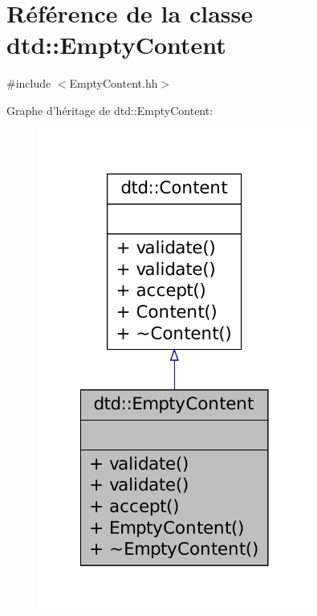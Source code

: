 \hypertarget{classdtd_1_1_empty_content}{
\section{Référence de la classe dtd::EmptyContent}
\label{classdtd_1_1_empty_content}
}


{\ttfamily \#include $<$EmptyContent.hh$>$}



Graphe d'héritage de dtd::EmptyContent:\nopagebreak
\begin{figure}[H]
\begin{center}
\leavevmode
\includegraphics[width=254pt]{classdtd_1_1_empty_content__inherit__graph}
\end{center}
\end{figure}


